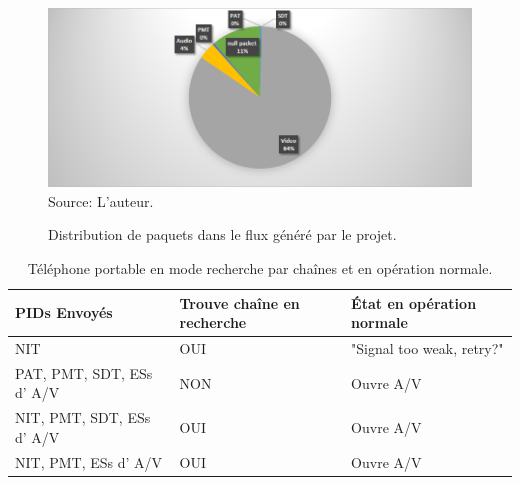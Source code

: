 \documentclass[12pt,a4paper]{article}
\begin{document}
\begin{figure}[!h]
\centering
\caption{Distribution de paquets dans le flux généré par le projet.}
\includegraphics[width=0.9\linewidth]{pictures/graph_generated_dump.png}
\\Source: L'auteur.
\label{fig:graph_generated_dump}
\end{figure}

\begin{table}
    \caption {Téléphone portable en mode recherche par chaînes et en opération normale.}
    \begin{center}
\begin{tabular}{|l|l|l|}
    \hline
    PIDs Envoyés              & Trouve chaîne en recherche & État en opération normale \\ \hline
    NIT                    & OUI                           & "Signal too weak, retry?"  \\ \hline
    PAT, PMT, SDT, ESs d' A/V  & NON                            & Ouvre A/V                  \\ \hline
    NIT, PMT, SDT, ESs d' A/V  & OUI                           & Ouvre A/V                  \\ \hline
    NIT, PMT, ESs d' A/V       & OUI                           & Ouvre A/V                  \\ \hline
    \end{tabular}
	\label{tab_cell}
\end{center}
\end{table}
\end{document}
